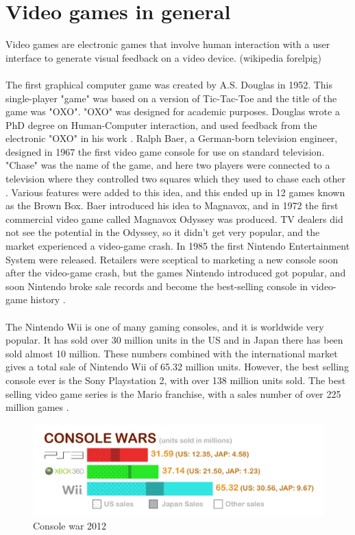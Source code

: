 \section{Video games in general}
Video games are electronic games that involve human interaction with a user interface to generate visual feedback on a video device. (wikipedia forelpig)\\ \\
The first graphical computer game was created by A.S. Douglas in 1952. This single-player "game" was based on a version of Tic-Tac-Toe and the title of the game was "OXO". "OXO" was designed for academic purposes.  Douglas wrote a PhD degree on Human-Computer interaction, and used feedback from the electronic "OXO" in his work \cite{abouthiginbotham}. Ralph Baer, a German-born television engineer, designed in 1967 the first video game console for use on standard television. "Chase" was the name of the game, and here two players were connected to a television where they controlled two squares which they used to chase each other \cite{videogameHistory}. Various features were added to this idea, and this ended up in 12 games known as the Brown Box. Baer introduced his idea to Magnavox, and in 1972 the first commercial video game called Magnavox Odyssey was produced. TV dealers did not see the potential in the Odyssey, so it didn't get very popular, and the market experienced a video-game crash. In 1985 the first Nintendo Entertainment System were released. Retailers were sceptical to marketing a new console soon after the video-game crash, but the games Nintendo introduced got popular, and soon Nintendo broke sale records and become the best-selling console in video-game history \cite{consoleHistory}. \\ \\
The Nintendo Wii is one of many gaming consoles, and it is worldwide very popular. It has sold over 30 million units in the US and in Japan there has been sold almost 10 million. These numbers combined with the international market gives a total sale of Nintendo Wii of 65.32 million units. However, the best selling console ever is the Sony Playstation 2, with over 138 million units sold. The best selling video game series is the Mario franchise, with a sales number of over 225 million games \cite{statistics2012}. 
\begin{figure}[h!]
\label{fig:ConsoleWarsAll}
\begin{center}
\includegraphics[scale=0.5]{consolewarsall}
\caption[Console war]{Console war 2012 \cite{statistics2012}}
\end{center}
\end{figure}
